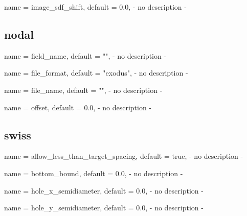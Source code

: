 \begin{parameter}{
    name    = {image_sdf_shift},
    default = {0.0},
}
- no description -
\end{parameter}

\subsection{nodal}

\begin{parameter}{
    name    = {field_name},
    default = {""},
}
- no description -
\end{parameter}

\begin{parameter}{
    name    = {file_format},
    default = {"exodus"},
}
- no description -
\end{parameter}

\begin{parameter}{
    name    = {file_name},
    default = {""},
}
- no description -
\end{parameter}

\begin{parameter}{
    name    = {offset},
    default = {0.0},
}
- no description -
\end{parameter}

\subsection{swiss}

\begin{parameter}{
    name    = {allow_less_than_target_spacing},
    default = {true},
}
- no description -
\end{parameter}

\begin{parameter}{
    name    = {bottom_bound},
    default = {0.0},
}
- no description -
\end{parameter}

\begin{parameter}{
    name    = {hole_x_semidiameter},
    default = {0.0},
}
- no description -
\end{parameter}

\begin{parameter}{
    name    = {hole_y_semidiameter},
    default = {0.0},
}
- no description -
\end{parameter}

